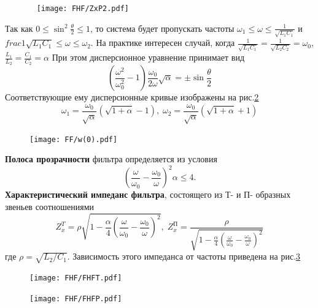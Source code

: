 \begin{figure}[h!]
	\centering 
	\texttt{[image: FHF/ZxP2.pdf]}
	\caption{}
	\label{fig:7.2}
\end{figure}
Так как $\displaystyle 0\leq\sin^2\frac{\theta}{2}\leq1$, то система будет пропускать частоты $\displaystyle\omega_1\leq\omega\leq\frac{1}{\sqrt{L_1C_1}}$ и $\displaystyle frac{1}{\sqrt{L_1C_1}}\leq\omega\leq\omega_2$. На практике интересен случай, когда $\displaystyle \frac{1}{\sqrt{L_1C_1}}=\frac{1}{\sqrt{L_2C_2}}=\omega_0$, $\displaystyle \frac{L_1}{L_2}=\frac{C_1}{C_2}=\alpha$
При этом дисперсионное уравнение принимает вид
\begin{equation}
\label{eq:7.4}
\left(\frac{\omega^2}{\omega^2_0}-1\right)\frac{\omega_0}{2\omega}\sqrt{\alpha}=\pm\sin\frac{\theta}{2}
\end{equation}
Соответствующие ему дисперсионные кривые изображены на рис.\ref{fig:7.3}
\begin{equation}
\label{eq:7.5}
\omega_1=\frac{\omega_0}{\sqrt{\alpha}}(\sqrt{1+\alpha}-1),\;
\omega_2=\frac{\omega_0}{\sqrt{\alpha}}(\sqrt{1+\alpha}+1)
\end{equation}
\begin{figure}
	\texttt{[image: FF/w(0).pdf]}
	\caption{}
	\label{fig:7.3}
\end{figure}
\textbf{Полоса прозрачности} фильтра определяется из условия 
\begin{equation}
\label{eq:7.6}
\left(\frac{\omega}{\omega_0}-\frac{\omega_0}{\omega}\right)^2\alpha\leq 4.
\end{equation}
\textbf{Характеристический импеданс фильтра}, состоящего из Т- и П- образных звеньев соотношениями
\begin{equation}
\label{eq:7.7}
Z^T_x=\rho\sqrt{1-\frac{\alpha}{4}\left(\frac{\omega}{\omega_0}-\frac{\omega_0}{\omega}\right)^2},\;
Z^\text{П}_x=\frac{\rho}{\sqrt{1-\frac{\alpha}{4}\left(\frac{\omega}{\omega_0}-\frac{\omega_0}{\omega}\right)^2}}
\end{equation}
где $\rho=\sqrt{L_2/C_1}$. Зависимость этого импеданса от частоты приведена на рис.\ref{fig:7.4}
\begin{figure}
\begin{minipage}{0.49\linewidth}
	\centering
	\texttt{[image: FHF/FHFT.pdf]}
\end{minipage}
\begin{minipage}{0.49\linewidth}
	\centering
	\texttt{[image: FHF/FHFP.pdf]}
\end{minipage}
\caption{}
\label{fig:7.4}
\end{figure}

